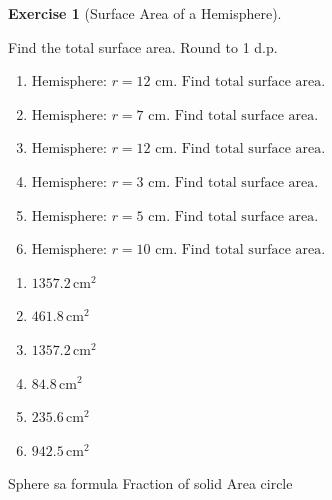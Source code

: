 \documentclass[
  letterpaper,
  DIV=11,
  numbers=noendperiod]{scrreprt}
\theoremstyle{definition}
\newtheorem{exercise}{Exercise}[chapter]
\theoremstyle{remark}
\begin{document}
\begin{exercise}[Surface Area of a
Hemisphere]\protect\hypertarget{exr-cur-13}{}\label{exr-cur-13}

Find the total surface area. Round to 1 d.p.

\begin{enumerate}
\def\labelenumi{\alph{enumi})}
\item
  \(\text{Hemisphere: }r=12\text{ cm. Find total surface area.}\)
\item
  \(\text{Hemisphere: }r=7\text{ cm. Find total surface area.}\)
\item
  \(\text{Hemisphere: }r=12\text{ cm. Find total surface area.}\)
\item
  \(\text{Hemisphere: }r=3\text{ cm. Find total surface area.}\)
\item
  \(\text{Hemisphere: }r=5\text{ cm. Find total surface area.}\)
\item
  \(\text{Hemisphere: }r=10\text{ cm. Find total surface area.}\)
\end{enumerate}

\begin{tcolorbox}[enhanced jigsaw, opacitybacktitle=0.6, coltitle=black, arc=.35mm, colframe=quarto-callout-tip-color-frame, colback=white, bottomrule=.15mm, left=2mm, colbacktitle=quarto-callout-tip-color!10!white, titlerule=0mm, opacityback=0, title=\textcolor{quarto-callout-tip-color}{\faLightbulb}\hspace{0.5em}{🔍 View Solution}, leftrule=.75mm, breakable, rightrule=.15mm, bottomtitle=1mm, toptitle=1mm, toprule=.15mm]

\begin{enumerate}
\def\labelenumi{\alph{enumi})}
\item
  \(1357.2\,\text{cm}^{2}\)
\item
  \(461.8\,\text{cm}^{2}\)
\item
  \(1357.2\,\text{cm}^{2}\)
\item
  \(84.8\,\text{cm}^{2}\)
\item
  \(235.6\,\text{cm}^{2}\)
\item
  \(942.5\,\text{cm}^{2}\)
\end{enumerate}

\end{tcolorbox}

{Sphere sa formula} {Fraction of solid} {Area circle}

\end{exercise}
\end{document}
